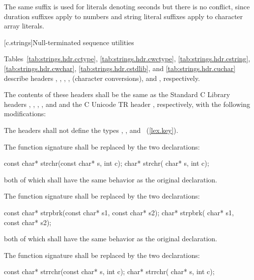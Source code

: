 \pnum \enternote
The same suffix  is used for  literals denoting seconds but there is no conflict, since duration suffixes apply to numbers and string literal suffixes apply to character array literals.
\exitnote

[c.strings]{Null-terminated sequence utilities}

\pnum
Tables~\ref{tab:strings.hdr.cctype},
\ref{tab:strings.hdr.cwctype}, \ref{tab:strings.hdr.cstring},
\ref{tab:strings.hdr.cwchar},
\ref{tab:strings.hdr.cstdlib},
and \ref{tab:strings.hdr.cuchar}
describe headers
,
,
,
,
(character conversions),
 and
,
respectively.

\pnum
The contents of these headers shall be the same as the Standard C Library headers
,
,
,
,
and
and the C Unicode TR header ,
respectively, with the following modifications:

\pnum
{}%
The headers shall not define the types
, , and
~(\ref{lex.key}).

\pnum
{}%
The function signature
shall be replaced by the two declarations:

\begin{codeblock}
const char* strchr(const char* s, int c);
      char* strchr(      char* s, int c);
\end{codeblock}

both of which shall have the same behavior as the original declaration.

\pnum
{}%
The function signature
shall be replaced by the two declarations:

\begin{codeblock}
const char* strpbrk(const char* s1, const char* s2);
      char* strpbrk(      char* s1, const char* s2);
\end{codeblock}

both of which shall have the same behavior as the original declaration.

\pnum
{}%
The function signature
shall be replaced by the two declarations:

\begin{codeblock}
const char* strrchr(const char* s, int c);
      char* strrchr(      char* s, int c);
\end{codeblock}

